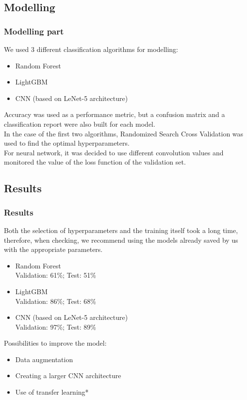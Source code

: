 \documentclass[8pt]{beamer}
\begin{document}
\subsection{Modelling}
\begin{frame}
\frametitle{Modelling part}
We used 3 different classification algorithms for modelling:
\begin{itemize}
    \item<1-> Random Forest
    \item<1-> LightGBM
    \item<1-> CNN (based on LeNet-5 architecture)
\end{itemize}

Accuracy was used as a performance metric, but a confusion matrix and a classification report were also built for each model.\\
\vspace{2mm}
In the case of the first two algorithms, Randomized Search Cross Validation was used to find the optimal hyperparameters.\\
\vspace{2mm}
For neural network, it was decided to use different convolution values and monitored the value of the loss function of the validation set.
\end{frame}

\subsection{Results}
\begin{frame}
\frametitle{Results}
Both the selection of hyperparameters and the training itself took a long time, therefore, when checking, we recommend using the models already saved by us with the appropriate parameters.\\
\vspace{2mm}
\begin{itemize}
    \item<1-> Random Forest\\
    Validation: 61\%; Test: 51\%\\
    \item<1-> LightGBM\\
    Validation: 86\%; Test: 68\%
    \item<1-> CNN (based on LeNet-5 architecture)\\
    Validation: 97\%; Test: 89\%
\end{itemize}
\vspace{2mm}
Possibilities to improve the model:
\begin{itemize}
    \item<1-> Data augmentation
    \item<1-> Creating a larger CNN architecture
    \item<1-> Use of transfer learning*
\end{itemize}

\end{frame}
\end{document}
